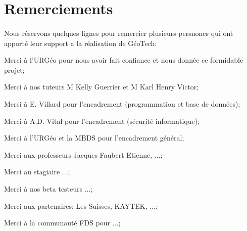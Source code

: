 \section{Remerciements}
\paragraph{}
Nous réservons quelques lignes pour remercier plusieurs persnones qui ont apporté leur support a la réalisation de GéoTech:\par
Merci à l'URGéo pour nous avoir fait confiance et nous donnée ce formidable projet;\par
Merci à nos tuteurs M Kelly Guerrier et M Karl Henry Victor;\par
Merci à  E. Villard pour l'encadrement (programmation et base de données);\par
Merci à A.D. Vital pour l'encadrement (sécurité informatique);\par
Merci à l'URGéo et la MBDS pour l'encadrement général;\par
Merci aux professeurs Jacques Faubert Etienne, ...;\par
Merci au stagiaire ...;\par
Merci à nos beta testeurs ...;\par
Merci aux partenaires: Les Suisses, KAYTEK, ...;\par
Merci à la communauté FDS pour ...;\par
